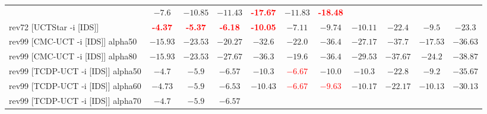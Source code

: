 \documentclass{article}
\begin{document}
\begin{tabular}{|l|r@{$\pm$}rr@{$\pm$}rr@{$\pm$}rr@{$\pm$}rr@{$\pm$}rr@{$\pm$}rr@{$\pm$}rr@{$\pm$}rr@{$\pm$}rr@{$\pm$}r|}
& \multicolumn{2}{c}{$-7.6$}
& \multicolumn{2}{c}{$-10.85$}
& \multicolumn{2}{c}{$-11.43$}
& \multicolumn{2}{c}{\textbf{\textcolor{red}{-17.67}}}
& \multicolumn{2}{c}{$-11.83$}
& \multicolumn{2}{c|}{\textbf{\textcolor{red}{-18.48}}}
\\
rev72 [UCTStar -i [IDS]]
& \multicolumn{2}{c}{\textbf{\textcolor{red}{-4.37}}}
& \multicolumn{2}{c}{\textbf{\textcolor{red}{-5.37}}}
& \multicolumn{2}{c}{\textbf{\textcolor{red}{-6.18}}}
& \multicolumn{2}{c}{\textbf{\textcolor{red}{-10.05}}}
& \multicolumn{2}{c}{$-7.11$}
& \multicolumn{2}{c}{$-9.74$}
& \multicolumn{2}{c}{$-10.11$}
& \multicolumn{2}{c}{$-22.4$}
& \multicolumn{2}{c}{$-9.5$}
& \multicolumn{2}{c|}{$-23.3$}
\\
\hline
rev99 [CMC-UCT -i [IDS]] alpha50
& \multicolumn{2}{c}{$-15.93$}
& \multicolumn{2}{c}{$-23.53$}
& \multicolumn{2}{c}{$-20.27$}
& \multicolumn{2}{c}{$-32.6$}
& \multicolumn{2}{c}{$-22.0$}
& \multicolumn{2}{c}{$-36.4$}
& \multicolumn{2}{c}{$-27.17$}
& \multicolumn{2}{c}{$-37.7$}
& \multicolumn{2}{c}{$-17.53$}
& \multicolumn{2}{c|}{$-36.63$}
\\
rev99 [CMC-UCT -i [IDS]] alpha80
& \multicolumn{2}{c}{$-15.93$}
& \multicolumn{2}{c}{$-23.53$}
& \multicolumn{2}{c}{$-27.67$}
& \multicolumn{2}{c}{$-36.3$}
& \multicolumn{2}{c}{$-19.6$}
& \multicolumn{2}{c}{$-36.4$}
& \multicolumn{2}{c}{$-29.53$}
& \multicolumn{2}{c}{$-37.67$}
& \multicolumn{2}{c}{$-24.2$}
& \multicolumn{2}{c|}{$-38.87$}
\\
rev99 [TCDP-UCT -i [IDS]] alpha50
& \multicolumn{2}{c}{\textbf{$-4.7$}}
& \multicolumn{2}{c}{\textbf{$-5.9$}}
& \multicolumn{2}{c}{\textbf{$-6.57$}}
& \multicolumn{2}{c}{\textbf{$-10.3$}}
& \multicolumn{2}{c}{\textbf{\textcolor{red}{$-6.67$}}}
& \multicolumn{2}{c}{\textbf{$-10.0$}}
& \multicolumn{2}{c}{\textbf{$-10.3$}}
& \multicolumn{2}{c}{$-22.8$}
& \multicolumn{2}{c}{\textbf{$-9.2$}}
& \multicolumn{2}{c|}{$-35.67$}
\\
rev99 [TCDP-UCT -i [IDS]] alpha60
& \multicolumn{2}{c}{\textbf{$-4.73$}}
& \multicolumn{2}{c}{\textbf{$-5.9$}}
& \multicolumn{2}{c}{\textbf{$-6.53$}}
& \multicolumn{2}{c}{\textbf{$-10.43$}}
& \multicolumn{2}{c}{\textbf{\textcolor{red}{$-6.67$}}}
& \multicolumn{2}{c}{\textbf{\textcolor{red}{$-9.63$}}}
& \multicolumn{2}{c}{\textbf{$-10.17$}}
& \multicolumn{2}{c}{$-22.17$}
& \multicolumn{2}{c}{\textbf{$-10.13$}}
& \multicolumn{2}{c|}{$-30.13$}
\\
rev99 [TCDP-UCT -i [IDS]] alpha70
& \multicolumn{2}{c}{\textbf{$-4.7$}}
& \multicolumn{2}{c}{\textbf{$-5.9$}}
& \multicolumn{2}{c}{\textbf{$-6.57$}}

\end{tabular}
\end{document}
